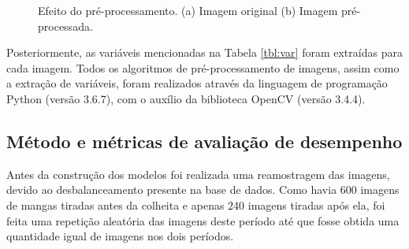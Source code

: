 \begin{figure}[H]
    \caption{Efeito do pré-processamento. (a) Imagem original (b) Imagem pré-processada.}\label{fig:prep}
\end{figure}

Posteriormente, as variáveis mencionadas na Tabela \ref{tbl:var} foram extraídas para cada imagem. Todos os algoritmos de pré-processamento de imagens, assim como a extração de variáveis, foram realizados através da linguagem de programação Python (versão 3.6.7), com o auxílio da biblioteca OpenCV (versão 3.4.4).

\subsection{Método e métricas de avaliação de desempenho}
Antes da construção dos modelos foi realizada uma reamostragem das imagens, devido ao desbalanceamento presente na base de dados. Como havia 600 imagens de mangas tiradas antes da colheita e apenas 240 imagens tiradas após ela, foi feita uma repetição aleatória das imagens deste período até que fosse obtida uma quantidade igual de imagens nos dois períodos.


